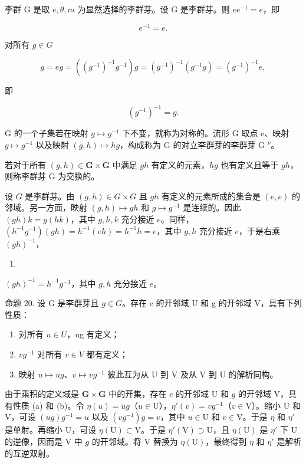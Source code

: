 李群 G 是取 \(e, \theta, m\) 为显然选择的李群芽。设 G 是李群芽。则 \(ee^{-1} = e\)，即

\[
e ^ {- 1} = e.\tag{8}
\]

对所有 \(g\in G\)

\[
g = e g = ((g ^ {- 1}) ^ {- 1} g ^ {- 1}) g = (g ^ {- 1}) ^ {- 1} (g ^ {- 1} g) = (g ^ {- 1}) ^ {- 1} e,
\]

即

\[
(g ^ {- 1}) ^ {- 1} = g.\tag{9}
\]

G 的一个子集若在映射 \(g \mapsto g^{-1}\) 下不变，就称为对称的。流形 G 取点 e、映射 \(g \mapsto g^{-1}\) 以及映射 \((g, h) \mapsto hg\)，构成称为 G 的对立李群芽的李群芽 G \(^{\nu}\)。

若对于所有 \((g,h)\in \mathbf{G}\times \mathbf{G}\) 中满足 \(gh\) 有定义的元素，\(hg\) 也有定义且等于 \(gh\)，则称李群芽 G 为交换的。

设 \(G\) 是李群芽。由 \((g, h) \in G \times G\) 且 \(gh\) 有定义的元素所成的集合是 \((e, e)\) 的邻域。另一方面，映射 \((g, h) \mapsto gh\) 和 \(g \mapsto g^{-1}\) 是连续的。因此 \((gh)k = g(hk)\)，其中 \(g, h, k\) 充分接近 \(e\)。同样，\((h^{-1}g^{-1})(gh) = h^{-1}(eh) = h^{-1}h = e\)，其中 \(g, h\) 充分接近 \(e\)，于是右乘 \((gh)^{-1}\)，

\begin{enumerate}
\def\labelenumi{(\arabic{enumi})}
\setcounter{enumi}{9}
\tightlist
\item
\end{enumerate}

\((gh)^{-1} = h^{-1}g^{-1}\)，其中 \(g,h\) 充分接近 \(e\)。

命题 20. 设 G 是李群芽且 \(g \in G\)。存在 e 的开邻域 U 和 g 的开邻域 V，具有下列性质：

\begin{enumerate}
\def\labelenumi{(\alph{enumi})}
\item
  对所有 \(u \in U\)，ug 有定义；
\item
  \(vg^{-1}\) 对所有 \(v \in V\) 都有定义；
\item
  映射 \(u \mapsto ug\)、\(v \mapsto vg^{-1}\) 彼此互为从 U 到 V 及从 V 到 U 的解析同构。
\end{enumerate}

  由于乘积的定义域是 \(\mathbf{G} \times \mathbf{G}\) 中的开集，存在 \(e\) 的开邻域 U 和 \(g\) 的开邻域 V，具有性质 (a) 和 (b)。令 \(\eta(u) = ug\)（\(u \in \mathrm{U}\)），\(\eta'(v) = vg^{-1}\)（\(v \in \mathrm{V}\)）。缩小 U 和 V，可设 \((ug)g^{-1} = u\) 以及 \((vg^{-1})g = v\)，其中 \(u \in \mathrm{U}\) 和 \(v \in \mathrm{V}\)。于是 \(\eta\) 和 \(\eta'\) 是单射。再缩小 U，可设 \(\eta(\mathrm{U}) \subset \mathrm{V}\)。于是 \(\eta'(\mathrm{V}) \supset \mathrm{U}\)，且 \(\eta(\mathrm{U})\) 是 \(\eta'\) 下 U 的逆像，因而是 V 中 \(g\) 的开邻域。将 V 替换为 \(\eta(\mathrm{U})\)，最终得到 \(\eta\) 和 \(\eta'\) 是解析的互逆双射。

